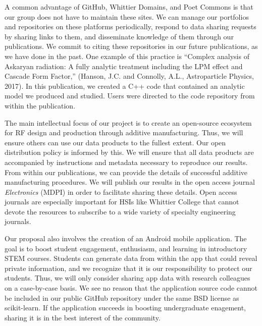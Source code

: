 \documentclass[11pt]{amsart}
\begin{document}
A common advantage of GitHub, Whittier Domains, and Poet Commons is that our group does not have to maintain these sites.  We can manage our portfolios and repositories on these platforms periodically, respond to data sharing requests by sharing links to them, and disseminate knowledge of them through our publications.  We commit to citing these repositories in our future publications, as we have done in the past.  One example of this practice is ``Complex analysis of Askaryan radiation: A fully analytic treatment including the LPM effect and Cascade Form Factor,'' (Hanson, J.C. and Connolly, A.L., Astroparticle Physics, 2017).  In this publication, we created a C++ code that contained an analytic model we produced and studied.  Users were directed to the code repository from within the publication.  

The main intellectual focus of our project is to create an open-source ecosystem for RF design and production through additive manufacturing.  Thus, we will ensure others can use our data products to the fullest extent.  Our open distribution policy is informed by this.  We will ensure that all data products are accompanied by instructions and metadata necessary to reproduce our results.  From within our publications, we can provide the details of successful additive manufacturing procedures.  We will publish our results in the open access journal \textit{Electronics} (MDPI) in order to facilitate sharing these details.  Open access journals are especially important for HSIs like Whittier College that cannot devote the resources to subscribe to a wide variety of specialty engineering journals.  

Our proposal also involves the creation of an Android mobile application.  The goal is to boost student engagement, enthusiasm, and learning in introductory STEM courses.  Students can generate data from within the app that could reveal private information, and we recognize that it is our responsibility to protect our students.  Thus, we will only consider sharing app data with research colleagues on a case-by-case basis.  We see no reason that the application source code cannot be included in our public GitHub repository under the same BSD license as scikit-learn.  If the application succeeds in boosting undergraduate enagement, sharing it is in the best interest of the community.

\clearpage



\end{document}
